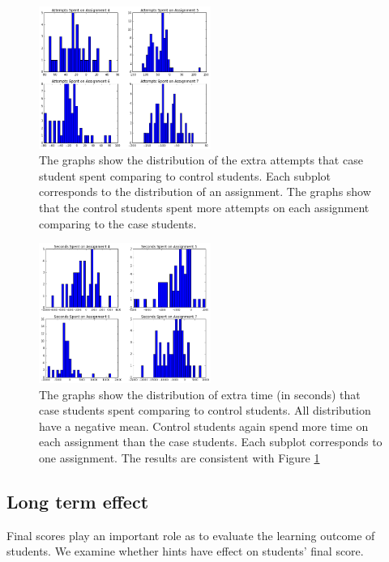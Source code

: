 \documentclass{sigchi}
\begin{document}
\begin{figure}[ht]
\includegraphics[width=0.5\textwidth]{image/assignment_tries_downstream.png}
\caption{The graphs show the distribution of the extra attempts that case student spent comparing to control students. Each subplot corresponds to the distribution of an assignment. The graphs show that the control students spent more attempts on each assignment comparing to the case students.}
    \label{fig:downstream_tries_analysis}
\end{figure}

\begin{figure}[ht]
\includegraphics[width=0.5\textwidth]{image/assignment_time_downstream.png}
\caption{The graphs show the distribution of extra time (in seconds) that case students spent comparing to control students. All distribution have a negative mean. Control students again spend more time on each assignment than the case students. Each subplot corresponds to one assignment. The results are consistent with Figure \ref{fig:downstream_tries_analysis}}
    \label{fig:downstream_time_analysis}
\end{figure}

\subsection{Long term effect}
Final scores play an important role as to evaluate the learning outcome of students. We examine whether hints have effect on students' final score.
\end{document}
